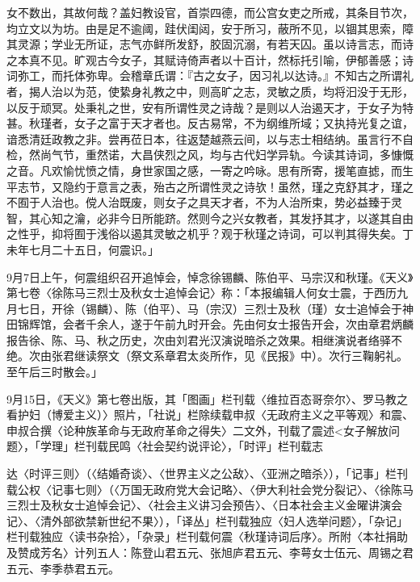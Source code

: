 \noindent 女不数出，其故何哉？盖妇教设官，首崇四德，而公宫女吏之所戒，其条目节次，均立文以为坊。由是足不逾阈，跬伏闺闼，安于所习，蔽所不见，以锢其思索，障其灵源；学业无所证，志气亦鲜所发舒，胶固沉溺，有若天囚。虽以诗言志，而诗之本真不见。旷观古今女子，其赋诗倚声者以十百计，然标托引喻，伊郁善感；诗词弥工，而托体弥卑。会稽章氏谓：『古之女子，因习礼以达诗。』不知古之所谓礼者，揭人治以为范，使絷身礼教之中，则高旷之志，灵敏之质，均将汩没于无形，以反于顽冥。处秉礼之世，安有所谓性灵之诗哉？是则以人治遏天才，于女子为特甚。秋瑾者，女子之富于天才者也。反古易常，不为纲维所域；又执持光复之谊，谙悉清廷政教之非。尝再莅日本，往返楚越燕云间，以与志士相结纳。虽言行不自检，然尚气节，重然诺，大昌侠烈之风，均与古代妇学异轨。今读其诗词，多慷慨之音。凡欢愉忧愤之情，身世家国之感，一寄之吟咏。思有所寄，援笔直摅，而生平志节，又隐约于意言之表，殆古之所谓性灵之诗欤！虽然，瑾之克舒其才，瑾之不囿于人治也。傥人治既废，则女子之具天才者，不为人治所束，势必益臻于灵智，其心知之瀹，必非今日所能跻。然则今之兴女教者，其发抒其才，以遂其自由之性乎，抑将囿于浅俗以遏其灵敏之机乎？观于秋瑾之诗词，可以判其得失矣。丁未年七月二十五日，何震识。」

9月7日上午，何震组织召开追悼会，悼念徐锡麟、陈伯平、马宗汉和秋瑾。《天义》第七卷〈徐陈马三烈士及秋女士追悼会记〉称：「本报编辑人何女士震，于西历九月七日，开徐（锡麟）、陈（伯平）、马（宗汉）三烈士及秋（瑾）女士追悼会于神田锦辉馆，会者千余人，遂于午前九时开会。先由何女士报告开会，次由章君炳麟报告徐、陈、马、秋之历史，次由刘君光汉演说暗杀之效果。相继演说者络驿不绝。次由张君继读祭文（祭文系章君太炎所作，见《民报》中）。次行三鞠躬礼。至午后三时散会。」

9月15日，《天义》第七卷出版，其「图画」栏刊载〈维拉百态哥奈尔〉、罗马教之看护妇（博爱主义）〉照片，「社说」栏除续载申叔〈无政府主义之平等观〉和震、申叔合撰〈论种族革命与无政府革命之得失〉二文外，刊载了震述<女子解放问题〉，「学理」栏刊载民鸣〈社会契约说评论〉，「时评」栏刊载志


\noindent 达〈时评三则〉（〈结婚奇谈〉、〈世界主义之公敌〉、〈亚洲之暗杀〉），「记事」栏刊载公权〈记事七则〉（〈万国无政府党大会记略〉、〈伊大利社会党分裂记〉、〈徐陈马三烈士及秋女士追悼会记〉、〈社会主义讲习会预告〉、〈日本社会主义金曜讲演会记〉、〈清外部欲禁新世纪不果〉），「译丛」栏刊载独应〈妇人选举问题〉，「杂记」栏刊载独应〈读书杂拾〉，「杂录」栏刊载何震〈秋瑾诗词后序〉。所附〈本社捐助及赞成芳名〉计列五人：陈登山君五元、张旭庐君五元、李萼女士伍元、周锡之君五元、李季恭君五元。

